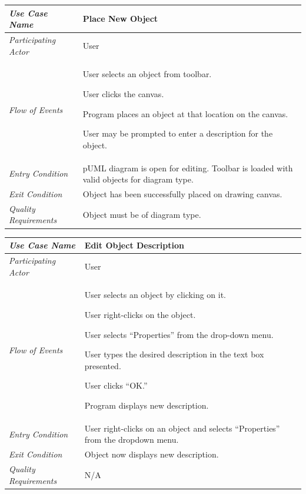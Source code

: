 \documentclass[twoside,letterpaper]{article}
\newenvironment{my_enumerate}{
\begin{enumerate}
  \setlength{\itemsep}{1pt}
  \setlength{\parskip}{0pt}
  \setlength{\parsep}{0pt}}{\end{enumerate}
}
\begin{document}
\begin{flushleft}
\tablehead{}
\begin{tabular}{|m{2.0in} m{5.0in}|}
\hline
{\bfseries\emph{Use Case Name}}
& {\bfseries Place New Object}
\\\hline
\emph{Participating Actor}
& User
\\\hline
\emph{Flow of Events}
& \begin{my_enumerate}
\item User selects an object from toolbar.
\item User clicks the canvas.
\item Program places an object at that location on the canvas.
\item User may be prompted to enter a description for the object.
\end{my_enumerate}
\\\hline
\emph{Entry Condition}
& pUML diagram is open for editing. \newline 
Toolbar is loaded with valid objects for diagram type.
\\\hline
\emph{Exit Condition}
& Object has been successfully placed on drawing canvas.
\\\hline
\emph{Quality Requirements}
& Object must be of diagram type.
\\\hline
\end{tabular}
\end{flushleft}
\bigskip

\begin{flushleft}
\tablehead{}
\begin{tabular}{|m{2.0in} m{5.0in}|}
\hline
{\bfseries\emph{Use Case Name}}
& {\bfseries Edit Object Description}
\\\hline
\emph{Participating Actor}
& User
\\\hline
\emph{Flow of Events}
& \begin{my_enumerate}
\item User selects an object by clicking on it.
\item User right-clicks on the object.
\item User selects ``Properties'' from the drop-down menu.
\item User types the desired description in the text box presented.
\item User clicks ``OK.''
\item Program displays new description.
\end{my_enumerate}
\\\hline
\emph{Entry Condition}
& User right-clicks on an object and selects ``Properties'' from the dropdown menu.
\\\hline
\emph{Exit Condition}
& Object now displays new description.
\\\hline
\emph{Quality Requirements}
& N/A
\\\hline
\end{tabular}
\end{flushleft}
\bigskip
\end{document}
